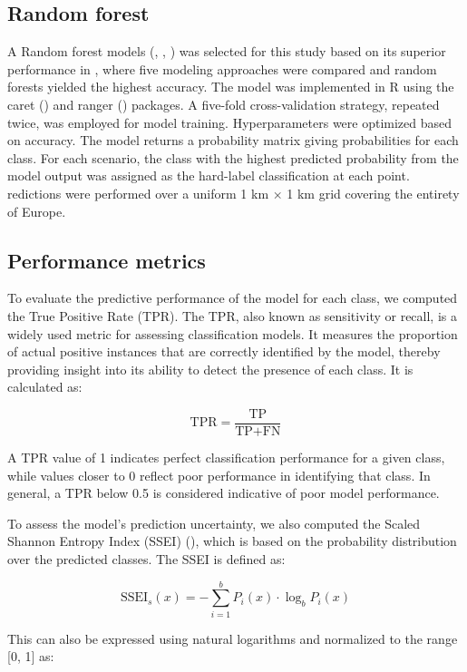 \documentclass[
]{krantz}
\begin{document}
\subsection{Random forest}\label{random-forest}

A Random forest models (\citet{breiman2001}, \citet{cutler2007}, \citet{biau2016}) was selected for this study based on its superior performance in \citet{hengl2018}, where five modeling approaches were compared and random forests yielded the highest accuracy. The model was implemented in R using the caret (\citet{kuhn2008}) and ranger (\citet{marvin2017}) packages. A five-fold cross-validation strategy, repeated twice, was employed for model training. Hyperparameters were optimized based on accuracy. The model returns a probability matrix giving probabilities for each class. For each scenario, the class with the highest predicted probability from the model output was assigned as the hard-label classification at each point.
redictions were performed over a uniform 1 km × 1 km grid covering the entirety of Europe.

\subsection{Performance metrics}\label{performance-metrics}

To evaluate the predictive performance of the model for each class, we computed the True Positive Rate (TPR). The TPR, also known as sensitivity or recall, is a widely used metric for assessing classification models. It measures the proportion of actual positive instances that are correctly identified by the model, thereby providing insight into its ability to detect the presence of each class. It is calculated as:

\[
\text{TPR} = \frac{\text{TP}}{\text{TP} + \text{FN}}
\]

A TPR value of 1 indicates perfect classification performance for a given class, while values closer to 0 reflect poor performance in identifying that class. In general, a TPR below 0.5 is considered indicative of poor model performance.

To assess the model's prediction uncertainty, we also computed the Scaled Shannon Entropy Index (SSEI) (\citet{shannon1949}), which is based on the probability distribution over the predicted classes. The SSEI is defined as:

\[
\text{SSEI}_s(x) = -\sum_{i=1}^{b} P_i(x) \cdot \log_b P_i(x)
\]

This can also be expressed using natural logarithms and normalized to the range {[}0, 1{]} as:
\end{document}
